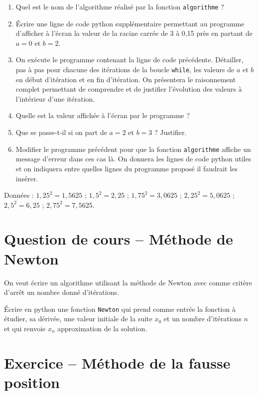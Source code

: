 \begin{enumerate}
 \item Quel est le nom de l'algorithme réalisé par la fonction \texttt{algorithme} ?
 
 \item Écrire une ligne de code python supplémentaire permettant au programme d'afficher à l'écran la valeur de la racine carrée de 3 à 0,15 près en partant de $a=0$ et $b=2$.
 
 \item On exécute le programme contenant la ligne de code précédente. Détailler, pas à pas pour chacune des itérations de la boucle \texttt{while}, les valeurs de $a$ et $b$ en début d'itération et en fin d'itération. On présentera le raisonnement complet permettant de comprendre et de justifier l'évolution des valeurs à l'intérieur d'une itération.
 
 \item Quelle est la valeur affichée à l'écran par le programme ?
 
 \item Que se passe-t-il si on part de $a=2$ et $b=3$ ? Justifier.
 
 \item Modifier le programme précédent pour que la fonction \texttt{algorithme} affiche un message d'erreur dans ces cas là. On donnera les lignes de code python utiles et on indiquera entre quelles lignes du programme proposé il faudrait les insérer.

\end{enumerate}

Données : $1,25^2=1,5625$ ; $ 1,5^2=2,25$ ; $1,75^2=3,0625$ ; $2,25^2 = 5,0625$ ; $2,5^2=6,25$ ; $2,75^2=7,5625$.

\section{Question de cours -- Méthode de Newton}

On veut écrire un algorithme utilisant la méthode de Newton avec comme critère d'arrêt un nombre donné d'itérations.

Écrire en python une fonction \verb?Newton? qui prend comme entrée la fonction à étudier, sa dérivée, une valeur initiale de la suite $x_0$ et un nombre d'itérations $n$ et qui renvoie $x_n$ approximation de la solution.

\newpage
\section{Exercice -- Méthode de la fausse position}

